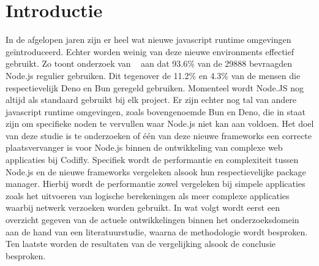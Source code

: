 
\section{Introductie}%
\label{sec:introductie}
In de afgelopen jaren zijn er heel wat nieuwe javascript runtime omgevingen geïntroduceerd. 
Echter worden weinig van deze nieuwe environments effectief gebruikt. 
Zo toont onderzoek van ~\textcite{Greif2022} aan dat 93.6\% van de 29888 bevraagden Node.js regulier gebruiken.
Dit tegenover de 11.2\% en 4.3\% van de mensen die respectievelijk Deno en Bun geregeld gebruiken.
Momenteel wordt Node.JS nog altijd als standaard gebruikt bij elk project. 
Er zijn echter nog tal van andere javascript runtime omgevingen, zoals bovengenoemde Bun en Deno, 
die in staat zijn om specifieke noden te vervullen waar Node.js niet kan aan voldoen.
Het doel van deze studie is te onderzoeken of één van deze nieuwe frameworks een correcte plaatsvervanger is voor Node.js 
binnen de ontwikkeling van complexe web applicaties bij Codifly. 
Specifiek wordt de performantie en complexiteit tussen Node.js en de nieuwe frameworks vergeleken alsook 
hun respectievelijke package manager. 
Hierbij wordt de performantie zowel vergeleken bij simpele applicaties zoals het uitvoeren van logische berekeningen
als meer complexe applicaties waarbij netwerk verzoeken worden gebruikt.
In wat volgt wordt eerst een overzicht gegeven van de actuele ontwikkelingen binnen het
onderzoeksdomein aan de hand van een literatuurstudie, waarna de methodologie wordt besproken.
Ten laatste worden de resultaten van de vergelijking alsook de conclusie besproken.



